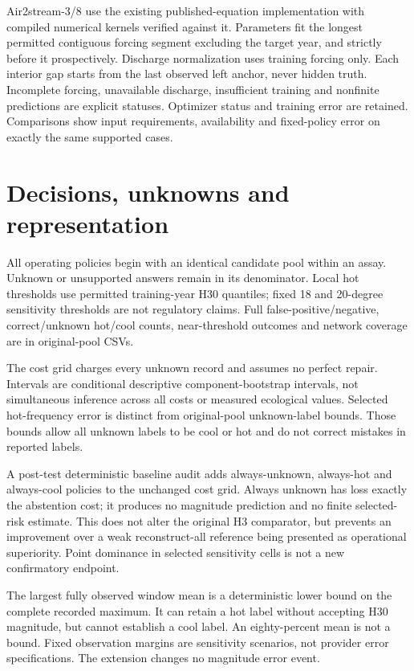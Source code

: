\documentclass[draft]{agujournal2025}
\begin{document}
Air2stream-3/8 use the existing published-equation implementation with compiled numerical kernels verified against it. Parameters fit the longest permitted contiguous forcing segment excluding the target year, and strictly before it prospectively. Discharge normalization uses training forcing only. Each interior gap starts from the last observed left anchor, never hidden truth. Incomplete forcing, unavailable discharge, insufficient training and nonfinite predictions are explicit statuses. Optimizer status and training error are retained. Comparisons show input requirements, availability and fixed-policy error on exactly the same supported cases.

\section{Decisions, unknowns and representation}
All operating policies begin with an identical candidate pool within an assay. Unknown or unsupported answers remain in its denominator. Local hot thresholds use permitted training-year H30 quantiles; fixed 18 and 20-degree sensitivity thresholds are not regulatory claims. Full false-positive/negative, correct/unknown hot/cool counts, near-threshold outcomes and network coverage are in original-pool CSVs.

The cost grid charges every unknown record and assumes no perfect repair. Intervals are conditional descriptive component-bootstrap intervals, not simultaneous inference across all costs or measured ecological values. Selected hot-frequency error is distinct from original-pool unknown-label bounds. Those bounds allow all unknown labels to be cool or hot and do not correct mistakes in reported labels.

A post-test deterministic baseline audit adds always-unknown, always-hot and always-cool policies to the unchanged cost grid. Always unknown has loss exactly the abstention cost; it produces no magnitude prediction and no finite selected-risk estimate. This does not alter the original H3 comparator, but prevents an improvement over a weak reconstruct-all reference being presented as operational superiority. Point dominance in selected sensitivity cells is not a new confirmatory endpoint.

The largest fully observed window mean is a deterministic lower bound on the complete recorded maximum. It can retain a hot label without accepting H30 magnitude, but cannot establish a cool label. An eighty-percent mean is not a bound. Fixed observation margins are sensitivity scenarios, not provider error specifications. The extension changes no magnitude error event.
\end{document}
